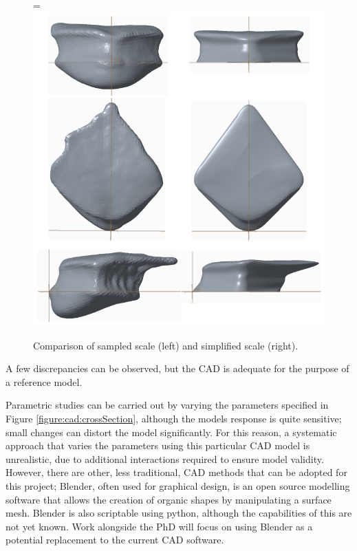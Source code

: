 \documentclass[12pt,oneside,a4paper]{article}
\newcommand*{\vcenteredhbox}[1]{\begingroup
\setbox0=\hbox{#1}\parbox{\wd0}{\box0}\endgroup}
\begin{document}
\begin{figure}
\centering
\vcenteredhbox{\includegraphics[width=\linewidth]{images/cad/finalCadComparisons.png}}
\caption{Comparison of sampled scale (left) and simplified scale (right).}
\label{figure:cad:scaleComparison}
\end{figure}
%
 A few discrepancies can be observed, but the CAD is adequate for the purpose of a reference model.
 
 Parametric studies can be carried out by varying the parameters specified in Figure \ref{figure:cad:crossSection}, although the models response is quite sensitive; small changes can distort the model significantly. For this reason, a systematic approach that varies the parameters using this particular CAD model is unrealistic, due to additional interactions required to ensure model validity. However, there are other, less traditional, CAD methods that can be adopted for this project; Blender, often used for graphical design, is an open source modelling software that allows the creation of organic shapes by manipulating a surface mesh. Blender is also scriptable using python, although the capabilities of this are not yet known. Work alongside the PhD will focus on using Blender as a potential replacement to the current CAD software.
 
\end{document}
